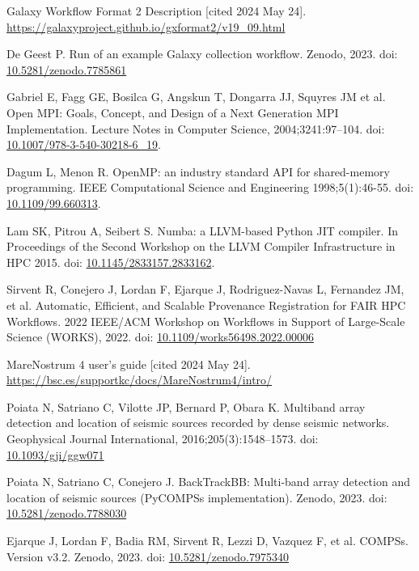 \documentclass[10pt,letterpaper]{article}
\begin{document}
\begin{thebibliography}{10}
\begin{small}
Galaxy Workflow Format 2 Description [cited 2024 May 24].
\url{https://galaxyproject.github.io/gxformat2/v19_09.html}

De Geest P.
Run of an example Galaxy collection workflow.
Zenodo, 2023.
doi: \href{https://doi.org/10.5281/zenodo.7785861}{10.5281/zenodo.7785861}

Gabriel E, Fagg GE, Bosilca G, Angskun T, Dongarra JJ, Squyres JM et al.
Open MPI: Goals, Concept, and Design of a Next Generation MPI Implementation.
Lecture Notes in Computer Science, 2004;3241:97--104.
doi: \href{https://doi.org/10.1007/978-3-540-30218-6_19}{10.1007/978-3-540-30218-6\_19}.

Dagum L, Menon R.
OpenMP: an industry standard API for shared-memory programming.
IEEE Computational Science and Engineering 1998;5(1):46-55.
doi: \href{https://doi.org/10.1109/99.660313}{10.1109/99.660313}.

Lam SK, Pitrou A, Seibert S.
Numba: a LLVM-based Python JIT compiler.
In Proceedings of the Second Workshop on the LLVM Compiler Infrastructure in HPC 2015.
doi: \href{https://doi.org/10.1145/2833157.2833162}{10.1145/2833157.2833162}.

Sirvent R, Conejero J, Lordan F, Ejarque J, Rodriguez-Navas L, Fernandez JM, et al.
Automatic, Efficient, and Scalable Provenance Registration for FAIR HPC Workflows.
2022 IEEE/ACM Workshop on Workflows in Support of Large-Scale Science (WORKS), 2022.
doi: \href{https://doi.org/10.1109/works56498.2022.00006}{10.1109/works56498.2022.00006}

MareNostrum 4 user's guide [cited 2024 May 24].
\url{https://bsc.es/supportkc/docs/MareNostrum4/intro/}

Poiata N, Satriano C, Vilotte JP, Bernard P, Obara K.
Multiband array detection and location of seismic sources recorded by dense seismic networks.
Geophysical Journal International, 2016;205(3):1548--1573.
doi: \href{https://doi.org/10.1093/gji/ggw071}{10.1093/gji/ggw071}

Poiata N, Satriano C, Conejero J.
BackTrackBB: Multi-band array detection and location of seismic sources (PyCOMPSs implementation).
Zenodo, 2023.
doi: \href{https://doi.org/10.5281/zenodo.7788030}{10.5281/zenodo.7788030}

Ejarque J, Lordan F, Badia RM, Sirvent R, Lezzi D, Vazquez F, et al.
COMPSs. Version v3.2.
Zenodo, 2023.
doi: \href{https://doi.org/10.5281/zenodo.7975340}{10.5281/zenodo.7975340}


\end{small}
\end{thebibliography}
\end{document}
